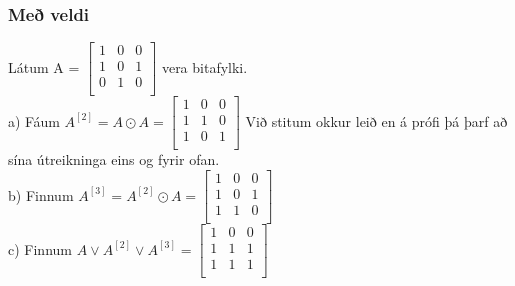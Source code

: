 \subsubsection*{Með veldi}

Látum A = 
$\begin{bmatrix}
    1 & 0 & 0 \\
    1 & 0 & 1 \\
    0 & 1 & 0 \\
\end{bmatrix}$ vera bitafylki.\\
a) Fáum $A^{[2]}= A \odot A = 
\begin{bmatrix}
    1 & 0 & 0 \\
    1 & 1 & 0 \\
    1 & 0 & 1 \\
\end{bmatrix}$ Við stitum okkur leið en á prófi þá þarf að\vspace*{-1.3em} \hspace*{16.7em}sína útreikninga eins og fyrir ofan.\vspace*{1.3em}\\
b) Finnum $A^{[3]}= A^{[2]} \odot A = 
\begin{bmatrix}
    1 & 0 & 0 \\
    1 & 0 & 1 \\
    1 & 1 & 0 \\
\end{bmatrix}$\vspace*{1em}\\
c) Finnum $A \vee A^{[2]} \vee A^{[3]} = 
\begin{bmatrix}
    1 & 0 & 0 \\
    1 & 1 & 1 \\
    1 & 1 & 1 \\
\end{bmatrix}$
\newpage